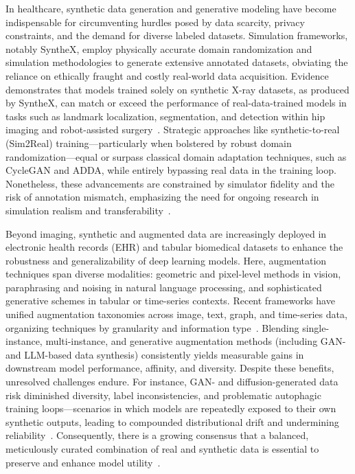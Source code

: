 In healthcare, synthetic data generation and generative modeling have become indispensable for circumventing hurdles posed by data scarcity, privacy constraints, and the demand for diverse labeled datasets. Simulation frameworks, notably SyntheX, employ physically accurate domain randomization and simulation methodologies to generate extensive annotated datasets, obviating the reliance on ethically fraught and costly real-world data acquisition. Evidence demonstrates that models trained solely on synthetic X-ray datasets, as produced by SyntheX, can match or exceed the performance of real-data-trained models in tasks such as landmark localization, segmentation, and detection within hip imaging and robot-assisted surgery~\cite{ref65}. Strategic approaches like synthetic-to-real (Sim2Real) training---particularly when bolstered by robust domain randomization---equal or surpass classical domain adaptation techniques, such as CycleGAN and ADDA, while entirely bypassing real data in the training loop. Nonetheless, these advancements are constrained by simulator fidelity and the risk of annotation mismatch, emphasizing the need for ongoing research in simulation realism and transferability~\cite{ref65,ref75}.

Beyond imaging, synthetic and augmented data are increasingly deployed in electronic health records (EHR) and tabular biomedical datasets to enhance the robustness and generalizability of deep learning models. Here, augmentation techniques span diverse modalities: geometric and pixel-level methods in vision, paraphrasing and noising in natural language processing, and sophisticated generative schemes in tabular or time-series contexts. Recent frameworks have unified augmentation taxonomies across image, text, graph, and time-series data, organizing techniques by granularity and information type~\cite{ref62,ref63,ref64}. Blending single-instance, multi-instance, and generative augmentation methods (including GAN- and LLM-based data synthesis) consistently yields measurable gains in downstream model performance, affinity, and diversity. Despite these benefits, unresolved challenges endure. For instance, GAN- and diffusion-generated data risk diminished diversity, label inconsistencies, and problematic autophagic training loops---scenarios in which models are repeatedly exposed to their own synthetic outputs, leading to compounded distributional drift and undermining reliability~\cite{ref89,ref90}. Consequently, there is a growing consensus that a balanced, meticulously curated combination of real and synthetic data is essential to preserve and enhance model utility~\cite{ref89}.

